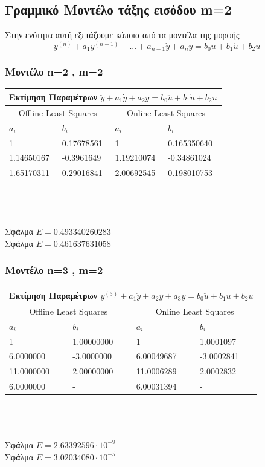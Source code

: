 \documentclass[12pt]{article}
\begin{document}
\subsection{Γραμμικό Μοντέλο τάξης εισόδου m=2}
Στην ενότητα αυτή εξετάζουμε κάποια από τα μοντέλα της μορφής
\[ y^{(n)}+a_1y^{(n-1)}+...+a_{n-1}\dot{y}+a_{n}y=b_{0}\ddot{u}+b_{1}\dot{u}+b_{2}u\]
\subsubsection{Μοντέλο n=2 , m=2}
\begin{tabular}{ |p{2.5cm}|p{2.5cm}||p{2.5cm}|p{2.5cm}| }
\hline
\multicolumn{4}{|c|}{ Εκτίμηση Παραμέτρων  $\ddot{y}+a_1\dot{y}+a_2 y=b_{0}\ddot{u}+b_{1}\dot{u}+b_{2}u$}\\
\hline
\multicolumn{2}{|c||}{Offline Least Squares}&
\multicolumn{2}{|c|}{Online Least Squares }
\\
\hline
$ a_{i}$ & $b_i$ &$ a_{i}$ & $b_i$  \\
\hline
 1          & 0.17678561 &     1       & 0.165350640 \\
1.14650167  & -0.3961649 & 1.19210074  & -0.34861024 \\
1.65170311  & 0.29016841 & 2.00692545  & 0.198010753 \\
\hline
\end{tabular}
\\ \\\\
Σφάλμα $E=0.493340260283$ \\
Σφάλμα $E=0.461637631058$
\subsubsection{Μοντέλο n=3 , m=2}
\begin{tabular}{ |p{2.5cm}|p{2.5cm}||p{2.5cm}|p{2.5cm}| }
\hline
\multicolumn{4}{|c|}{ Εκτίμηση Παραμέτρων  $y^{(3)}+a_1\ddot{y}+a_2\dot{y}+a_3 y=b_{0}\ddot{u}+b_{1}\dot{u}+b_{2}u$}\\
\hline
\multicolumn{2}{|c||}{Offline Least Squares}&
\multicolumn{2}{|c|}{Online Least Squares }
\\
\hline
$ a_{i}$ & $b_i$ &$ a_{i}$ & $b_i$  \\
\hline
 1          & 1.00000000 &     1       &  1.0001097 \\
 6.0000000  & -3.0000000 & 6.00049687  & -3.0002841 \\
11.0000000  & 2.00000000 & 11.0006289  &  2.0002832 \\
 6.0000000  & -          & 6.00031394  & - \\
\hline
\end{tabular}
\\ \\\\
Σφάλμα $E=2.63392596 \cdot 10^{-9}$ \\
Σφάλμα $E=3.02034080 \cdot 10^{-5}$
\end{document}
